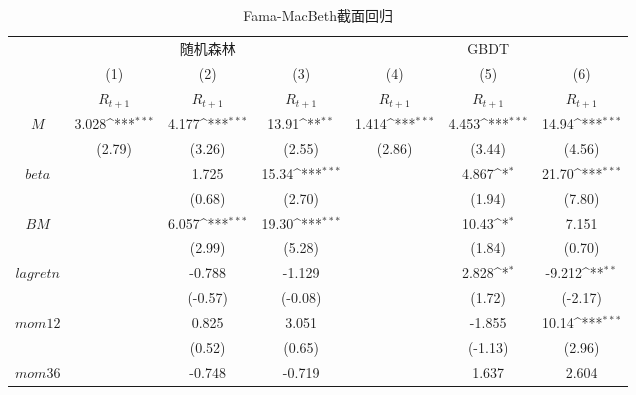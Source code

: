 \begin{table}[htbp]\centering
\def\sym#1{\ifmmode^{#1}\else\(^{#1}\)\fi}
\caption{Fama-MacBeth截面回归}
\label{fmb}
\begin{tabular*}{\hsize}{@{\hskip\tabcolsep\extracolsep\fill}*{7}{c}}
\toprule
&\multicolumn{3}{c}{随机森林}&\multicolumn{3}{c}{GBDT}\\
\cline{2-7} 
        &\multicolumn{1}{c}{(1)}&\multicolumn{1}{c}{(2)}&\multicolumn{1}{c}{(3)}&\multicolumn{1}{c}{(4)}&\multicolumn{1}{c}{(5)}&\multicolumn{1}{c}{(6)}\\
 &\multicolumn{1}{c}{$R_{t+1}$}&\multicolumn{1}{c}{$R_{t+1}$}&\multicolumn{1}{c}{$R_{t+1}$} &\multicolumn{1}{c}{$R_{t+1}$}&\multicolumn{1}{c}{$R_{t+1}$}&\multicolumn{1}{c}{$R_{t+1}$}\\
\midrule
$M $        &   3.028\sym{***}&    4.177\sym{***}&    13.91\sym{**}  &    1.414\sym{***}&    4.453\sym{***}&    14.94\sym{***}\\
          &  (2.79)         &   (3.26)         &   (2.55)      &   (2.86)         &   (3.44)         &   (4.56)      \\
$beta$      &                  &    1.725         &    15.34\sym{***}&                  &    4.867\sym{*}  &    21.70\sym{***}\\
          &                  &   (0.68)         &   (2.70)          &                  &   (1.94)         &   (7.80)     \\
$BM $       &                  &    6.057\sym{***}&    19.30\sym{***}     &                  &    10.43\sym{*}  &    7.151        \\
          &                  &   (2.99)         &   (5.28)        &                  &   (1.84)         &   (0.70)          \\
$lagretn $  &           &   -0.788         &   -1.129    &                  &    2.828\sym{*}  &   -9.212\sym{**}      \\
          &                  &  (-0.57)         &  (-0.08)    &                  &   (1.72)         &  (-2.17)        \\
$mom12  $   &                     &    0.825         &    3.051      &                  &   -1.855         &    10.14\sym{***}     \\
          &                  &   (0.52)         &   (0.65)         &                  &  (-1.13)         &   (2.96)         \\
$mom36  $   &              &   -0.748         &   -0.719   &                  &    1.637         &    2.604           \\

\end{tabular*}
\end{table}
